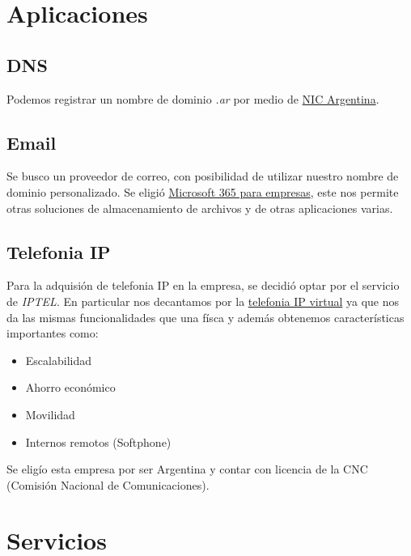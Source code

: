 \documentclass[11pt]{article}
\begin{document}
    \section{Aplicaciones}
    
        \subsection{DNS}
        Podemos registrar un nombre de dominio \textit{.ar} por medio de \href{https://nic.ar/es/dominios/aranceles}{NIC Argentina}.


        \subsection{Email}
        Se busco un proveedor de correo, con posibilidad de utilizar nuestro nombre de dominio personalizado. Se eligió \href{https://www.microsoft.com/es-ar/microsoft-365/business}{Microsoft 365 para empresas}, este nos permite otras soluciones de almacenamiento de archivos y de otras aplicaciones varias.

        \subsection{Telefonia IP}
        Para la adquisión de telefonia IP en la empresa, se decidió optar por el servicio de \textit{IPTEL}. En particular nos decantamos por la
        \href{https://www.iptel.com.ar/centrales-telefonicas/virtuales/}{telefonia IP virtual} ya que nos da las mismas funcionalidades que una físca y además obtenemos
        características importantes como:
        \begin{itemize}
            \item Escalabilidad
            \item Ahorro económico
            \item Movilidad
            \item Internos remotos (Softphone)
        \end{itemize}

        Se eligío esta empresa por ser Argentina y contar con licencia de la CNC (Comisión Nacional de Comunicaciones).


    \section{Servicios}
\end{document}
